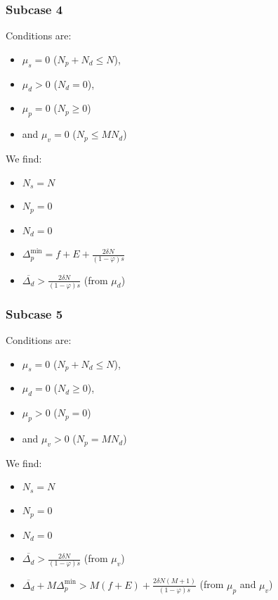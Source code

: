 \documentclass[english, a4paper]{article}
\theoremstyle{plain}
\theoremstyle{definition}
\theoremstyle{remark}
\begin{document}
\subsubsection{Subcase 4}

Conditions are:
\begin{itemize}
    \item $\mu_s = 0$ ($N_p + N_d \leq N$),
    \item $\mu_d > 0$ ($N_d = 0$),
    \item $\mu_p = 0$ ($N_p \geq 0$)
    \item and $\mu_v = 0$ ($N_p \leq MN_d$)
\end{itemize}

We find:
\begin{itemize}
    \item $N_s = N$
    \item $N_p = 0$
    \item $N_d = 0$
    \item $\Delta_p^{\text{min}} = f+ E + \frac{2\delta N}{(1 - \varphi) s}$
    \item $\overline{\Delta_d} >\frac{2\delta N}{(1 - \varphi) s}$ (from $\mu_d$)
\end{itemize}


\subsubsection{Subcase 5}

Conditions are:
\begin{itemize}
    \item $\mu_s = 0$ ($N_p + N_d \leq N$),
    \item $\mu_d = 0$ ($N_d \geq 0$),
    \item $\mu_p > 0$ ($N_p = 0$)
    \item and $\mu_v > 0$ ($N_p = MN_d$)
\end{itemize}

We find:
\begin{itemize}
    \item $N_s = N$
    \item $N_p = 0$
    \item $N_d = 0$
    \item $\overline{\Delta_d} >\frac{2\delta N}{(1 - \varphi) s}$ (from $\mu_v$)
    \item $\overline{\Delta_d} + M \Delta_p^{\text{min}} > M(f+ E) + \frac{2\delta N (M+1)}{(1 - \varphi) s}$ (from $\mu_p$ and $\mu_v$)
\end{itemize}
\end{document}
